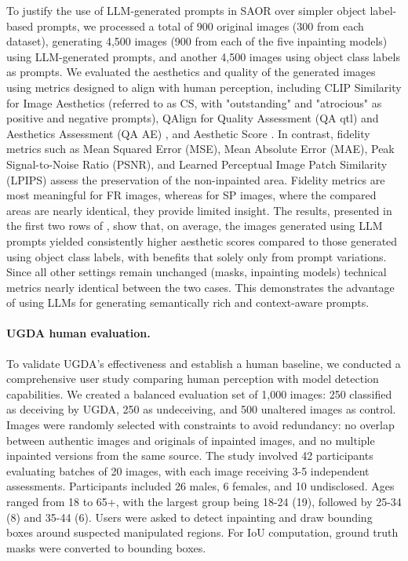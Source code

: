 To justify the use of LLM-generated prompts in SAOR over simpler object label-based prompts, we processed a total of 900 original images (300 from each dataset), generating 4,500 images (900 from each of the five inpainting models) using LLM-generated prompts, and another 4,500 images using object class labels as prompts. We evaluated the aesthetics and quality of the generated images using metrics designed to align with human perception, including CLIP Similarity for Image Aesthetics \cite{hentschel2022clipimageaeshetics} (referred to as CS, with "outstanding" and "atrocious" as positive and negative prompts), QAlign for Quality Assessment (QA qtl) and Aesthetics Assessment (QA AE) \cite{wu2023qalignteachinglmmsvisual}, and Aesthetic Score \cite{schuhmann2022laion5bopenlargescaledataset}. In contrast, fidelity metrics such as Mean Squared Error (MSE), Mean Absolute Error (MAE), Peak Signal-to-Noise Ratio (PSNR), and Learned Perceptual Image Patch Similarity (LPIPS) \cite{zhang2018unreasonableeffectivenessdeepfeatures} assess the preservation of the non-inpainted area. Fidelity metrics are most meaningful for FR images, whereas for SP images, where the compared areas are nearly identical, they provide limited insight. The results, presented in the first two rows of , show that, on average, the images generated using LLM prompts yielded consistently higher aesthetic scores compared to those generated using object class labels, with benefits that solely only from prompt variations. Since all other settings remain unchanged (masks, inpainting models) technical metrics nearly identical between the two cases. This demonstrates the advantage of using LLMs for generating semantically rich and context-aware prompts.
\paragraph{UGDA human evaluation.}
To validate UGDA's effectiveness and establish a human baseline, we conducted a comprehensive user study comparing human perception with model detection capabilities. We created a balanced evaluation set of 1,000 images: 250 classified as deceiving by UGDA, 250 as undeceiving, and 500 unaltered images as control. Images were randomly selected with constraints to avoid redundancy: no overlap between authentic images and originals of inpainted images, and no multiple inpainted versions from the same source. The study involved 42 participants evaluating batches of 20 images, with each image receiving 3-5 independent assessments. Participants included 26 males, 6 females, and 10 undisclosed. Ages ranged from 18 to 65+, with the largest group being 18-24 (19), followed by 25-34 (8) and 35-44 (6). Users were asked to detect inpainting and draw bounding boxes around suspected manipulated regions. For IoU computation, ground truth masks were converted to bounding boxes.

